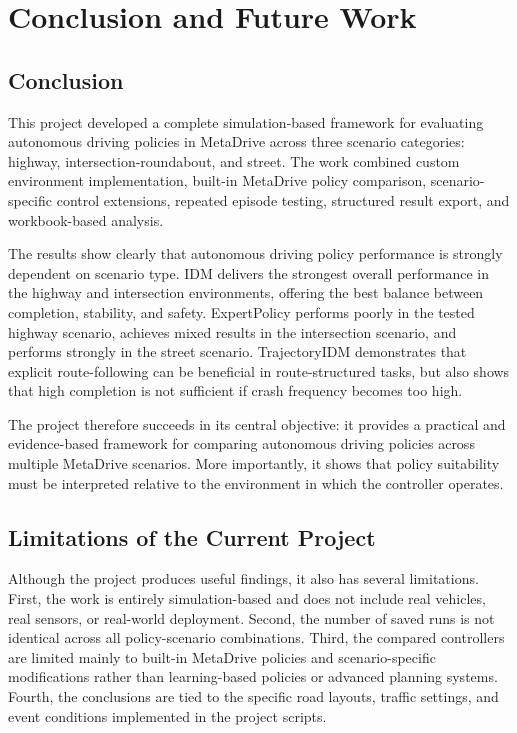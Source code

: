 \documentclass[12pt,a4paper]{report}
\begin{document}
\chapter{Conclusion and Future Work}

\section{Conclusion}
This project developed a complete simulation-based framework for evaluating autonomous driving policies in MetaDrive across three scenario categories: highway, intersection-roundabout, and street. The work combined custom environment implementation, built-in MetaDrive policy comparison, scenario-specific control extensions, repeated episode testing, structured result export, and workbook-based analysis.

The results show clearly that autonomous driving policy performance is strongly dependent on scenario type. IDM delivers the strongest overall performance in the highway and intersection environments, offering the best balance between completion, stability, and safety. ExpertPolicy performs poorly in the tested highway scenario, achieves mixed results in the intersection scenario, and performs strongly in the street scenario. TrajectoryIDM demonstrates that explicit route-following can be beneficial in route-structured tasks, but also shows that high completion is not sufficient if crash frequency becomes too high.

The project therefore succeeds in its central objective: it provides a practical and evidence-based framework for comparing autonomous driving policies across multiple MetaDrive scenarios. More importantly, it shows that policy suitability must be interpreted relative to the environment in which the controller operates.

\section{Limitations of the Current Project}
Although the project produces useful findings, it also has several limitations. First, the work is entirely simulation-based and does not include real vehicles, real sensors, or real-world deployment. Second, the number of saved runs is not identical across all policy-scenario combinations. Third, the compared controllers are limited mainly to built-in MetaDrive policies and scenario-specific modifications rather than learning-based policies or advanced planning systems. Fourth, the conclusions are tied to the specific road layouts, traffic settings, and event conditions implemented in the project scripts.
\end{document}
